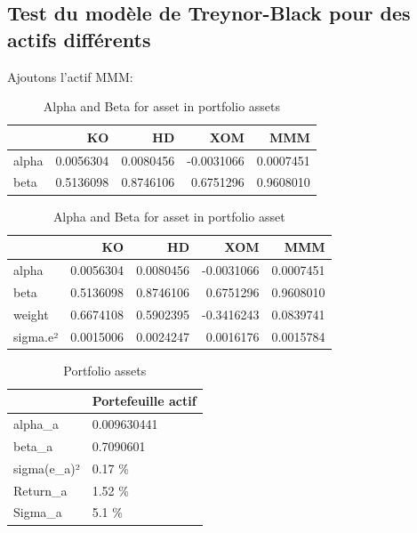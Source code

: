 \documentclass[
]{article}
\begin{document}
\hypertarget{test-du-moduxe8le-de-treynor-black-pour-des-actifs-diffuxe9rents}{%
\subsection{Test du modèle de Treynor-Black pour des actifs
différents}\label{test-du-moduxe8le-de-treynor-black-pour-des-actifs-diffuxe9rents}}

Ajoutons l'actif MMM:

\begin{table}[H]

\caption{\label{tab:unnamed-chunk-16}Alpha and Beta for asset in portfolio assets}
\centering
\begin{tabular}[t]{lrrrr}
\toprule
  & KO & HD & XOM & MMM\\
\midrule
alpha & 0.0056304 & 0.0080456 & -0.0031066 & 0.0007451\\
beta & 0.5136098 & 0.8746106 & 0.6751296 & 0.9608010\\
\bottomrule
\end{tabular}
\end{table}
\begin{table}[H]

\caption{\label{tab:unnamed-chunk-17}Alpha and Beta for asset in portfolio asset}
\centering
\begin{tabular}[t]{lrrrr}
\toprule
  & KO & HD & XOM & MMM\\
\midrule
alpha & 0.0056304 & 0.0080456 & -0.0031066 & 0.0007451\\
beta & 0.5136098 & 0.8746106 & 0.6751296 & 0.9608010\\
weight & 0.6674108 & 0.5902395 & -0.3416243 & 0.0839741\\
sigma.e² & 0.0015006 & 0.0024247 & 0.0016176 & 0.0015784\\
\bottomrule
\end{tabular}
\end{table}
\begin{table}[H]

\caption{\label{tab:unnamed-chunk-18}Portfolio assets}
\centering
\begin{tabular}[t]{ll}
\toprule
  & Portefeuille actif\\
\midrule
alpha\_a & 0.009630441\\
beta\_a & 0.7090601\\
sigma(e\_a)² & 0.17 \%\\
Return\_a & 1.52 \%\\
Sigma\_a & 5.1 \%\\
\bottomrule
\end{tabular}
\end{table}
\end{document}
